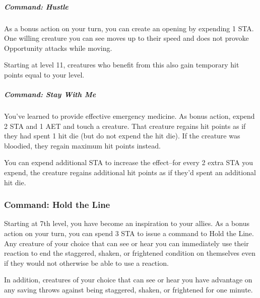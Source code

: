\subparagraph{Command: Hustle}
As a bonus action on your turn, you can create an opening by expending 1 STA. One willing creature you can see moves up to their speed and does not provoke Opportunity attacks while moving.

Starting at level 11, creatures who benefit from this also gain temporary hit points equal to your level.

\subparagraph{Command: Stay With Me}
You've learned to provide effective emergency medicine. As bonus action, expend 2 STA and 1 AET and touch a creature. That creature regains hit points as if they had spent 1 hit die (but do not expend the hit die). If the creature was bloodied, they regain maximum hit points instead.

You can expend additional STA to increase the effect--for every 2 extra STA you expend, the creature regains additional hit points as if they'd spent an additional hit die.

\subsubsection{Command: Hold the Line}
Starting at 7th level, you have become an inspiration to your allies. As a bonus action on your turn, you can spend 3 STA to issue a command to Hold the Line. Any creature of your choice that can see or hear you can immediately use their reaction to end the staggered, shaken, or frightened condition on themselves even if they would not otherwise be able to use a reaction.

In addition, creatures of your choice that can see or hear you have advantage on any saving throws against being staggered, shaken, or frightened for one minute.

